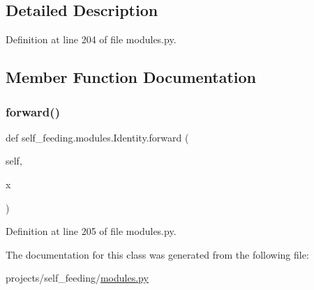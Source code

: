 \subsection{Detailed Description}


Definition at line 204 of file modules.\+py.



\subsection{Member Function Documentation}
\mbox{\label{classself__feeding_1_1modules_1_1Identity_ad2c920f8e5ba56e8d81483e89be517b4}} 
\subsubsection{\texorpdfstring{forward()}{forward()}}
{\footnotesize\ttfamily def self\+\_\+feeding.\+modules.\+Identity.\+forward (\begin{DoxyParamCaption}\item[{}]{self,  }\item[{}]{x }\end{DoxyParamCaption})}



Definition at line 205 of file modules.\+py.



The documentation for this class was generated from the following file\+:\begin{DoxyCompactItemize}
\item 
projects/self\+\_\+feeding/\hyperlink{projects_2self__feeding_2modules_8py}{modules.\+py}\end{DoxyCompactItemize}
